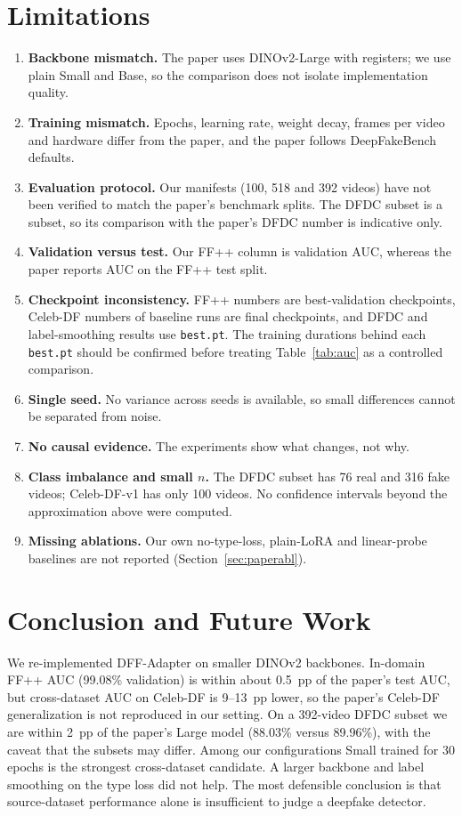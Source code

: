 \documentclass[lettersize,journal]{IEEEtran}
\begin{document}
\section{Limitations}\label{sec:lim}
\begin{enumerate}
\item \textbf{Backbone mismatch.} The paper uses DINOv2-Large with registers; we use plain Small and Base, so the comparison does not isolate implementation quality.
\item \textbf{Training mismatch.} Epochs, learning rate, weight decay, frames per video and hardware differ from the paper, and the paper follows DeepFakeBench defaults.
\item \textbf{Evaluation protocol.} Our manifests (100, 518 and 392 videos) have not been verified to match the paper's benchmark splits. The DFDC subset is a subset, so its comparison with the paper's DFDC number is indicative only.
\item \textbf{Validation versus test.} Our FF++ column is validation AUC, whereas the paper reports AUC on the FF++ test split.
\item \textbf{Checkpoint inconsistency.} FF++ numbers are best-validation checkpoints, Celeb-DF numbers of baseline runs are final checkpoints, and DFDC and label-smoothing results use \texttt{best.pt}. The training durations behind each \texttt{best.pt} should be confirmed before treating Table~\ref{tab:auc} as a controlled comparison.
\item \textbf{Single seed.} No variance across seeds is available, so small differences cannot be separated from noise.
\item \textbf{No causal evidence.} The experiments show what changes, not why.
\item \textbf{Class imbalance and small $n$.} The DFDC subset has 76 real and 316 fake videos; Celeb-DF-v1 has only 100 videos. No confidence intervals beyond the approximation above were computed.
\item \textbf{Missing ablations.} Our own no-type-loss, plain-LoRA and linear-probe baselines are not reported (Section~\ref{sec:paperabl}).
\end{enumerate}

\section{Conclusion and Future Work}
We re-implemented DFF-Adapter on smaller DINOv2 backbones. In-domain FF++ AUC (99.08\% validation) is within about 0.5~pp of the paper's test AUC, but cross-dataset AUC on Celeb-DF is 9--13~pp lower, so the paper's Celeb-DF generalization is not reproduced in our setting. On a 392-video DFDC subset we are within 2~pp of the paper's Large model (88.03\% versus 89.96\%), with the caveat that the subsets may differ. Among our configurations Small trained for 30 epochs is the strongest cross-dataset candidate. A larger backbone and label smoothing on the type loss did not help. The most defensible conclusion is that source-dataset performance alone is insufficient to judge a deepfake detector.
\end{document}
